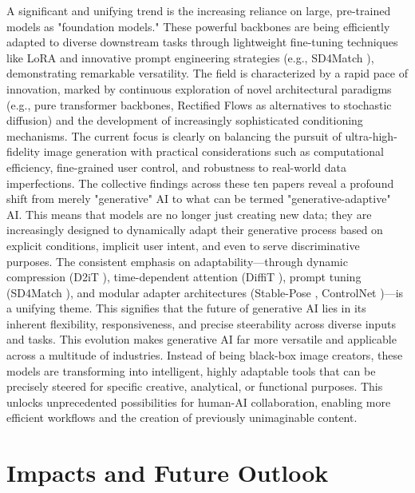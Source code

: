 \documentclass[a4paper]{article}
\begin{document}
A significant and unifying trend is the increasing reliance on large, pre-trained models as "foundation models." These powerful backbones are being efficiently adapted to diverse downstream tasks through lightweight fine-tuning techniques like LoRA and innovative prompt engineering strategies (e.g., SD4Match \cite{Li2023SD4Match}), demonstrating remarkable versatility. The field is characterized by a rapid pace of innovation, marked by continuous exploration of novel architectural paradigms (e.g., pure transformer backbones, Rectified Flows \cite{Esser2024ScalingRectifiedFlow} as alternatives to stochastic diffusion) and the development of increasingly sophisticated conditioning mechanisms. The current focus is clearly on balancing the pursuit of ultra-high-fidelity image generation with practical considerations such as computational efficiency, fine-grained user control, and robustness to real-world data imperfections. The collective findings across these ten papers reveal a profound shift from merely "generative" AI to what can be termed "generative-adaptive" AI. This means that models are no longer just creating new data; they are increasingly designed to dynamically adapt their generative process based on explicit conditions, implicit user intent, and even to serve discriminative purposes. The consistent emphasis on adaptability—through dynamic compression (D2iT \cite{Jia2025D2iT}), time-dependent attention (DiffiT \cite{Hatamizadeh2023DiffiT}), prompt tuning (SD4Match \cite{Li2023SD4Match}), and modular adapter architectures (Stable-Pose \cite{Wang2024StablePose}, ControlNet \cite{Zhang2023ControlNet})—is a unifying theme. This signifies that the future of generative AI lies in its inherent flexibility, responsiveness, and precise steerability across diverse inputs and tasks. This evolution makes generative AI far more versatile and applicable across a multitude of industries. Instead of being black-box image creators, these models are transforming into intelligent, highly adaptable tools that can be precisely steered for specific creative, analytical, or functional purposes. This unlocks unprecedented possibilities for human-AI collaboration, enabling more efficient workflows and the creation of previously unimaginable content.

\section{Impacts and Future Outlook}
\end{document}
